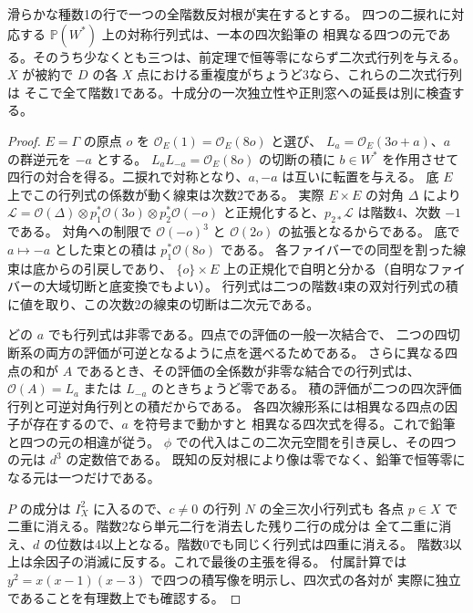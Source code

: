 \begin{proposition}\label{prop:elliptic-cofactor-quartic-pencil}
滑らかな種数1の行で一つの全階数反対根が実在するとする。
四つの二捩れに対応する $\mathbb P(W^*)$ 上の対称行列式は、一本の四次鉛筆の
相異なる四つの元である。そのうち少なくとも三つは、前定理で恒等零にならず二次式行列を与える。
$X$ が被約で $D$ の各 $X$ 点における重複度がちょうど3なら、これらの二次式行列は
そこで全て階数1である。十成分の一次独立性や正則窓への延長は別に検査する。
\end{proposition}
\begin{proof}
$E=\Gamma$ の原点 $o$ を $\mathcal O_E(1)=\mathcal O_E(8o)$ と選び、
$L_a=\mathcal O_E(3o+a)$、$a$ の群逆元を $-a$ とする。
$L_aL_{-a}=\mathcal O_E(8o)$ の切断の積に $b\in W^*$ を作用させて
四行の対合を得る。二捩れで対称となり、$a,-a$ は互いに転置を与える。
底 $E$ 上でこの行列式の係数が動く線束は次数2である。
実際 $E\times E$ の対角 $\Delta$ により
$\mathcal L=\mathcal O(\Delta)\otimes p_1^*\mathcal O(3o)\otimes p_2^*\mathcal O(-o)$
と正規化すると、$p_{2*}\mathcal L$ は階数4、次数 $-1$ である。
対角への制限で $\mathcal O(-o)^3$ と $\mathcal O(2o)$ の拡張となるからである。
底で $a\mapsto-a$ とした束との積は $p_1^*\mathcal O(8o)$ である。
各ファイバーでの同型を割った線束は底からの引戻しであり、
$\{o\}\times E$ 上の正規化で自明と分かる（自明なファイバーの大域切断と底変換でもよい）。
行列式は二つの階数4束の双対行列式の積に値を取り、この次数2の線束の切断は二次元である。

どの $a$ でも行列式は非零である。四点での評価の一般一次結合で、
二つの四切断系の両方の評価が可逆となるように点を選べるためである。
さらに異なる四点の和が $A$ であるとき、その評価の全係数が非零な結合での行列式は、
$\mathcal O(A)=L_a$ または $L_{-a}$ のときちょうど零である。
積の評価が二つの四次評価行列と可逆対角行列との積だからである。
各四次線形系には相異なる四点の因子が存在するので、$a$ を符号まで動かすと
相異なる四次式を得る。これで鉛筆と四つの元の相違が従う。
$\phi$ での代入はこの二次元空間を引き戻し、その四つの元は $d^3$ の定数倍である。
既知の反対根により像は零でなく、鉛筆で恒等零になる元は一つだけである。

$P$ の成分は $I_X^2$ に入るので、$c\ne0$ の行列 $N$ の全三次小行列式も
各点 $p\in X$ で二重に消える。階数2なら単元二行を消去した残り二行の成分は
全て二重に消え、$d$ の位数は4以上となる。階数0でも同じく行列式は四重に消える。
階数3以上は余因子の消滅に反する。これで最後の主張を得る。
付属計算では $y^2=x(x-1)(x-3)$ で四つの積写像を明示し、四次式の各対が
実際に独立であることを有理数上でも確認する。
\end{proof}
